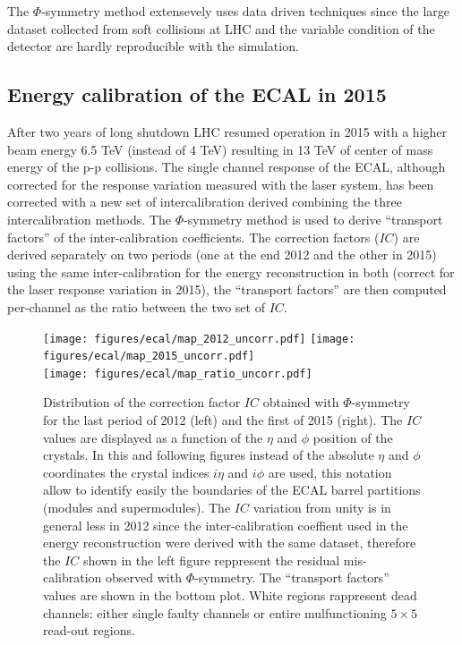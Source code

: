 The $\Phi$-symmetry method extensevely uses data driven techniques since the large dataset collected from soft collisions
at LHC and the variable condition of the detector are hardly reproducible with the simulation.

\subsection{Energy calibration of the ECAL in 2015}
\label{sec:calib_2015}

After two years of long shutdown LHC resumed operation in 2015 with a higher beam energy 6.5 TeV (instead of 4 TeV) resulting
in 13 TeV of center of mass energy of the p-p collisions. The single channel response of the ECAL, although corrected
for the response variation measured with the laser system, has been corrected with a new set of intercalibration
derived combining the three intercalibration methods. The $\Phi$-symmetry method is used to derive ``transport factors''
of the inter-calibration coefficients. The correction factors ($IC$) are derived separately on two periods
(one at the end 2012 and the other in 2015) using the same inter-calibration for the energy reconstruction in both
(correct for the laser response variation in 2015), the ``transport factors'' are then computed per-channel as the
ratio between the two set of $IC$.

\begin{figure}[h!]
  \centering
  \texttt{[image: figures/ecal/map\_2012\_uncorr.pdf]}
  \texttt{[image: figures/ecal/map\_2015\_uncorr.pdf]}\\
  \texttt{[image: figures/ecal/map\_ratio\_uncorr.pdf]}
  \caption{Distribution of the correction factor $IC$ obtained with $\Phi$-symmetry for the last
    period of 2012 (left) and the first of 2015 (right). The $IC$ values are displayed as a function
    of the $\eta$ and $\phi$ position of the crystals. In this and following figures instead of the absolute
    $\eta$ and $\phi$ coordinates the crystal indices $i\eta$ and $i\phi$ are used, this notation
    allow to identify easily the boundaries of the ECAL barrel partitions (modules and supermodules).
    The $IC$ variation from unity is in general less in 2012 since the inter-calibration coeffient used
    in the energy reconstruction were derived with the same dataset, therefore the $IC$ shown in the left figure
    reppresent the residual mis-calibration observed with $\Phi$-symmetry. The ``transport factors'' values
    are shown in the bottom plot. White regions rappresent dead channels: either single faulty channels or
  entire mulfunctioning $5\times 5$ read-out regions.}
  \label{fig:ic_phisym}
\end{figure}

